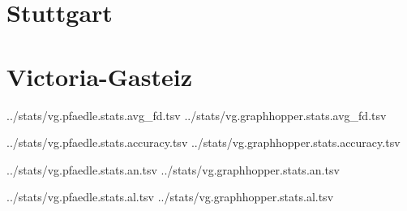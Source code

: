 
\section*{Stuttgart}



\section*{Victoria-Gasteiz}

			{../stats/vg.pfaedle.stats.avg_fd.tsv}
			{../stats/vg.graphhopper.stats.avg_fd.tsv}

				{../stats/vg.pfaedle.stats.accuracy.tsv}
				{../stats/vg.graphhopper.stats.accuracy.tsv}

		{../stats/vg.pfaedle.stats.an.tsv}
		{../stats/vg.graphhopper.stats.an.tsv}

		{../stats/vg.pfaedle.stats.al.tsv}
		{../stats/vg.graphhopper.stats.al.tsv}
	
	
